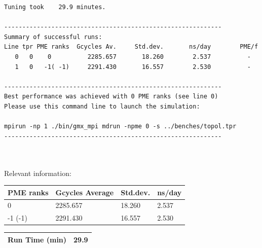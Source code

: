 \begin{lstlisting}[frame=single]
Tuning took    29.9 minutes.

------------------------------------------------------------
Summary of successful runs:
Line tpr PME ranks  Gcycles Av.     Std.dev.       ns/day        PME/f
   0   0    0          2285.657       18.260        2.537          -  
   1   0   -1( -1)     2291.430       16.557        2.530          -  

------------------------------------------------------------
Best performance was achieved with 0 PME ranks (see line 0)
Please use this command line to launch the simulation:

mpirun -np 1 ./bin/gmx_mpi mdrun -npme 0 -s ../benches/topol.tpr  
------------------------------------------------------------



\end{lstlisting}

Relevant information:
\begin{center}
    \begin{tabular}{|p{3.5cm}|p{3.5cm}|p{3.5cm}|p{3.5cm}|} \hline
         PME ranks & Gcycles Average & Std.dev. & ns/day \\ \hline
         0 & 2285.657  & 18.260  & 2.537  \\ \hline
         -1 (-1) & 2291.430 & 16.557 &  2.530  \\ \hline
    \end{tabular}
     \begin{tabular}{|p{3.5cm}|p{11.4cm}|} \hline
         Run Time (min) & 29.9 \\ \hline
    \end{tabular}
\end{center}

